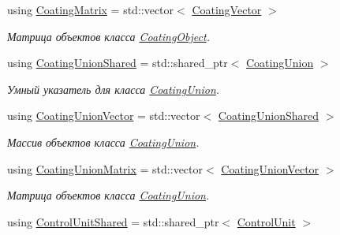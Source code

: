 \begin{DoxyCompactItemize}
\mbox{\label{namespacertm_ae3bb29510cfde424975be31866d2486e}} 
using \hyperlink{namespacertm_ae3bb29510cfde424975be31866d2486e}{Coating\+Matrix} = std\+::vector$<$ \hyperlink{namespacertm_ab16d0c62e4a4cf29f24dac0b8507faf6}{Coating\+Vector} $>$
\begin{DoxyCompactList}\small\item\em Матрица объектов класса \hyperlink{classrtm_1_1_coating_object}{Coating\+Object}. \end{DoxyCompactList}\item 
\mbox{\label{namespacertm_a0b1daa4ff7c2591d8433d441f9e56e4c}} 
using \hyperlink{namespacertm_a0b1daa4ff7c2591d8433d441f9e56e4c}{Coating\+Union\+Shared} = std\+::shared\+\_\+ptr$<$ \hyperlink{classrtm_1_1_coating_union}{Coating\+Union} $>$
\begin{DoxyCompactList}\small\item\em Умный указатель для класса \hyperlink{classrtm_1_1_coating_union}{Coating\+Union}. \end{DoxyCompactList}\item 
\mbox{\label{namespacertm_a230edca99ba683336f20c521a49d642f}} 
using \hyperlink{namespacertm_a230edca99ba683336f20c521a49d642f}{Coating\+Union\+Vector} = std\+::vector$<$ \hyperlink{namespacertm_a0b1daa4ff7c2591d8433d441f9e56e4c}{Coating\+Union\+Shared} $>$
\begin{DoxyCompactList}\small\item\em Массив объектов класса \hyperlink{classrtm_1_1_coating_union}{Coating\+Union}. \end{DoxyCompactList}\item 
\mbox{\label{namespacertm_adc6cbe68dc67c19da757de5768da04cc}} 
using \hyperlink{namespacertm_adc6cbe68dc67c19da757de5768da04cc}{Coating\+Union\+Matrix} = std\+::vector$<$ \hyperlink{namespacertm_a230edca99ba683336f20c521a49d642f}{Coating\+Union\+Vector} $>$
\begin{DoxyCompactList}\small\item\em Матрица объектов класса \hyperlink{classrtm_1_1_coating_union}{Coating\+Union}. \end{DoxyCompactList}\item 
\mbox{\label{namespacertm_a64296d558b2fa02bbf5870afffd61fd9}} 
using \hyperlink{namespacertm_a64296d558b2fa02bbf5870afffd61fd9}{Control\+Unit\+Shared} = std\+::shared\+\_\+ptr$<$ \hyperlink{classrtm_1_1_control_unit}{Control\+Unit} $>$

\end{DoxyCompactItemize}
